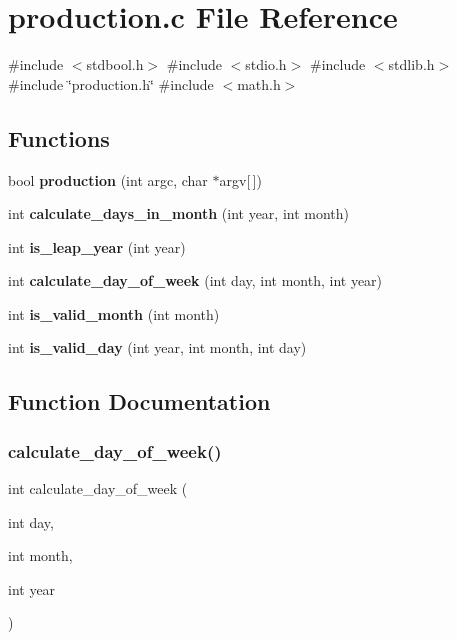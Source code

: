 \section{production.\+c File Reference}
\label{production_8c}
{\ttfamily \#include $<$stdbool.\+h$>$}\newline
{\ttfamily \#include $<$stdio.\+h$>$}\newline
{\ttfamily \#include $<$stdlib.\+h$>$}\newline
{\ttfamily \#include \char`\"{}production.\+h\char`\"{}}\newline
{\ttfamily \#include $<$math.\+h$>$}\newline
\subsection*{Functions}
\begin{DoxyCompactItemize}
\item 
bool \textbf{ production} (int argc, char $\ast$argv[$\,$])
\item 
int \textbf{ calculate\+\_\+days\+\_\+in\+\_\+month} (int year, int month)
\item 
int \textbf{ is\+\_\+leap\+\_\+year} (int year)
\item 
int \textbf{ calculate\+\_\+day\+\_\+of\+\_\+week} (int day, int month, int year)
\item 
int \textbf{ is\+\_\+valid\+\_\+month} (int month)
\item 
int \textbf{ is\+\_\+valid\+\_\+day} (int year, int month, int day)
\end{DoxyCompactItemize}


\subsection{Function Documentation}
\mbox{\label{production_8c_a366627f8be4bdb2683a04ca7254d9a2c}} 
\subsubsection{calculate\+\_\+day\+\_\+of\+\_\+week()}
{\footnotesize\ttfamily int calculate\+\_\+day\+\_\+of\+\_\+week (\begin{DoxyParamCaption}\item[{int}]{day,  }\item[{int}]{month,  }\item[{int}]{year }\end{DoxyParamCaption})}

